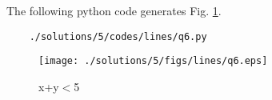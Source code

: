 The following python code generates Fig. \ref{fig:3.11.5_qsix}.
	\begin{lstlisting}
	./solutions/5/codes/lines/q6.py
	\end{lstlisting}
	\begin{figure}[!ht]
	\centering
	\texttt{[image: ./solutions/5/figs/lines/q6.eps]}
	\caption{x+y$<$5}
	\label{fig:3.11.5_qsix}	
	\end{figure}
	
